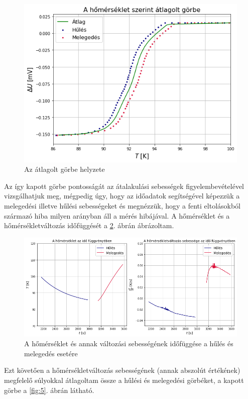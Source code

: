 \documentclass[12pt,a4paper]{article}
\begin{document}
\begin{figure}[!h]
\centering
\includegraphics[scale=0.65]{atlag}
\caption{Az átlagolt görbe helyzete}
\label{fig:3}
\end{figure}
\newpage
Az így kapott görbe pontosságát az átalakulási sebességek figyelembevételével vizsgálhatjuk meg, mégpedig úgy, hogy az időadatok segítségével képezzük a melegedési illetve hűlési sebességeket és megnézzük, hogy a fenti eltolásokból származó hiba milyen arányban áll a mérés hibájával. A hőmérséklet és a hőmérsékletváltozás időfüggését a \ref{fig:4}. ábrán ábrázoltam.\\
\begin{figure}[!h]
\centering
\hspace*{-1cm}
\includegraphics[scale=0.55]{hom_valt}
\caption{A hőmérséklet és annak változási sebességének időfüggése a hűlés és melegedés esetére}
\label{fig:4}
\end{figure}
\newline
Ezt követően a hőmérsékletváltozás sebességének (annak abszolút értékének) megfelelő súlyokkal átlagoltam össze a hűlési és melegedési görbéket, a kapott görbe a \ref{fig:5}. ábrán látható.
\end{document}
